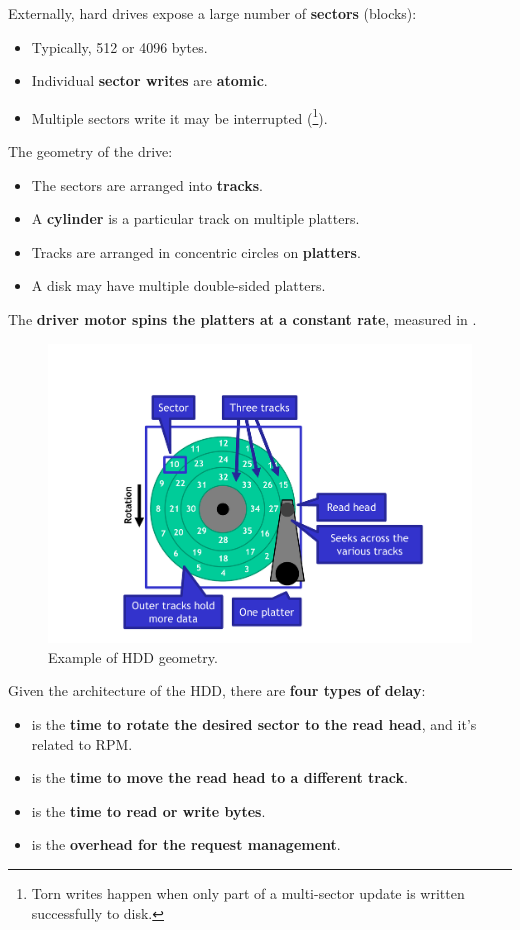 \noindent
Externally, hard drives expose a large number of \textbf{sectors} (blocks):
\begin{itemize}
    \item Typically, 512 or 4096 bytes.
    \item Individual \textbf{sector writes} are \textbf{atomic}.
    \item Multiple sectors write it may be interrupted (\footnote{Torn writes happen when only part of a multi-sector update is written successfully to disk.}).
\end{itemize}
The geometry of the drive:
\begin{itemize}
    \item The sectors are arranged into \textbf{tracks}.
    \item A \textbf{cylinder} is a particular track on multiple platters.
    \item Tracks are arranged in concentric circles on \textbf{platters}.
    \item A disk may have multiple double-sided platters.
\end{itemize}
The \textbf{driver motor spins the platters at a constant rate}, measured in .

\newpage

\begin{figure}[!htp]
    \centering
    \includegraphics[width=.8\textwidth]{img/files-7.pdf}
    \caption{Example of HDD geometry.}
\end{figure}

Given the architecture of the HDD, there are \textbf{four types of delay}:
\begin{itemize}\label{four types of hdd delay}
    \item {} is the \textbf{time to rotate the desired sector to the read head}, and it's related to RPM.
    \item {} is the \textbf{time to move the read head to a different track}.
    \item {} is the \textbf{time to read or write bytes}.
    \item {} is the \textbf{overhead for the request management}.
\end{itemize}

